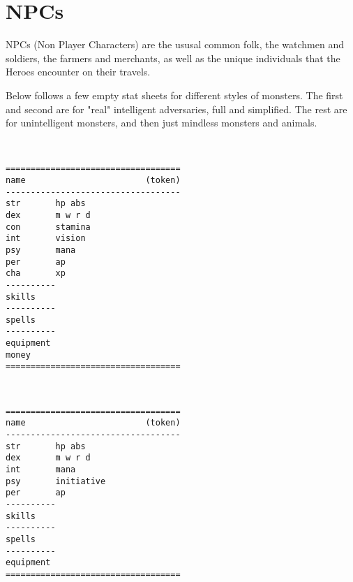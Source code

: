 

\raggedbottom






\chapter*{NPCs}

NPCs (Non Player Characters) are the ususal common folk, the watchmen and soldiers, the farmers and merchants, as well as the unique individuals that the Heroes encounter on their travels.

Below follows a few empty stat sheets for different styles of monsters. The first and second are for "real" intelligent adversaries, full and simplified. The rest are for unintelligent monsters, and then just mindless monsters and animals.

\

\raggedbottom

\goodbreak \begin{samepage} \small \begin{verbatim}
===================================
name                        (token)
-----------------------------------
str       hp abs
dex       m w r d
con       stamina
int       vision
psy       mana
per       ap
cha       xp
----------
skills
----------
spells
----------
equipment
money
===================================
\end{verbatim} \normalsize \end{samepage}

\

\goodbreak \begin{samepage} \small \begin{verbatim}
===================================
name                        (token)
-----------------------------------
str       hp abs
dex       m w r d
int       mana
psy       initiative
per       ap
----------
skills
----------
spells
----------
equipment
===================================
\end{verbatim} \normalsize \end{samepage}


